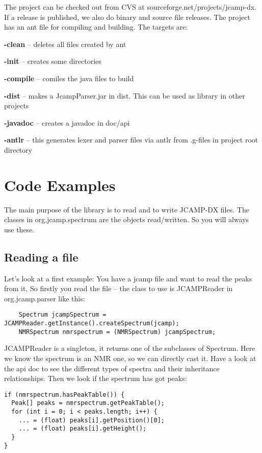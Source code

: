 \documentclass[a4paper]{book}
\begin{document}
The project can be checked out from CVS at sourceforge.net/projects/jcamp-dx. If a release is published, we also do binary and source file releases. The project has an ant file for compiling and building. The targets are:
\begin{tight_itemize}
  \item \textbf{-clean} -- deletes all files created by ant
  \item \textbf{-init} -- creates some directories
  \item \textbf{-compile} -- comiles the java files to build
  \item \textbf{-dist} -- makes a JcampParser.jar in dist. This can be used as library in other projects
  \item \textbf{-javadoc} -- creates a javadoc in doc/api
  \item \textbf{-antlr} -- this generates lexer and parser files via antlr from .g-files in project root directory
\end{tight_itemize}

\chapter{Code Examples}

The main purpose of the library is to read and to write JCAMP-DX files. The classes in org.jcamp.spectrum are the objects read/written. So you will always use these.

\section{Reading a file}

Let's look at a first example: You have a jcamp file and want to read the peaks from it. So firstly you read the file –  the class to use is JCAMPReader in org.jcamp.parser like this:

\begin{verbatim}
    Spectrum jcampSpectrum = JCAMPReader.getInstance().createSpectrum(jcamp);
    NMRSpectrum nmrspectrum = (NMRSpectrum) jcampSpectrum;
\end{verbatim}

JCAMPReader is a singleton, it returns one of the subclasses of Spectrum. Here we know the spectrum is an NMR one, so we can directly cast it. Have a look at the api doc to see the different types of spectra and their inheritance relationships. Then we look if the spectrum has got peaks:

\begin{verbatim}
if (nmrspectrum.hasPeakTable()) {
  Peak[] peaks = nmrspectrum.getPeakTable();
  for (int i = 0; i < peaks.length; i++) {
    ... = (float) peaks[i].getPosition()[0];
    ... = (float) peaks[i].getHeight();
  }
}
\end{verbatim}
\end{document}
